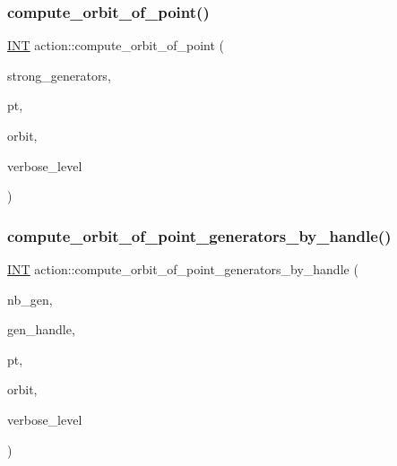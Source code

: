 \mbox{\label{classaction_af5d0e7c66ea088888ee852138f3ae012}} 
\subsubsection{\texorpdfstring{compute\+\_\+orbit\+\_\+of\+\_\+point()}{compute\_orbit\_of\_point()}}
{\footnotesize\ttfamily \mbox{\hyperlink{galois_8h_a09fddde158a3a20bd2dcadb609de11dc}{I\+NT}} action\+::compute\+\_\+orbit\+\_\+of\+\_\+point (\begin{DoxyParamCaption}\item[{\mbox{\hyperlink{classvector__ge}{vector\+\_\+ge}} \&}]{strong\+\_\+generators,  }\item[{\mbox{\hyperlink{galois_8h_a09fddde158a3a20bd2dcadb609de11dc}{I\+NT}}}]{pt,  }\item[{\mbox{\hyperlink{galois_8h_a09fddde158a3a20bd2dcadb609de11dc}{I\+NT}} $\ast$}]{orbit,  }\item[{\mbox{\hyperlink{galois_8h_a09fddde158a3a20bd2dcadb609de11dc}{I\+NT}}}]{verbose\+\_\+level }\end{DoxyParamCaption})}

\mbox{\label{classaction_a8d13b4c518ed1591695e06071de2fe6c}} 
\subsubsection{\texorpdfstring{compute\+\_\+orbit\+\_\+of\+\_\+point\+\_\+generators\+\_\+by\+\_\+handle()}{compute\_orbit\_of\_point\_generators\_by\_handle()}}
{\footnotesize\ttfamily \mbox{\hyperlink{galois_8h_a09fddde158a3a20bd2dcadb609de11dc}{I\+NT}} action\+::compute\+\_\+orbit\+\_\+of\+\_\+point\+\_\+generators\+\_\+by\+\_\+handle (\begin{DoxyParamCaption}\item[{\mbox{\hyperlink{galois_8h_a09fddde158a3a20bd2dcadb609de11dc}{I\+NT}}}]{nb\+\_\+gen,  }\item[{\mbox{\hyperlink{galois_8h_a09fddde158a3a20bd2dcadb609de11dc}{I\+NT}} $\ast$}]{gen\+\_\+handle,  }\item[{\mbox{\hyperlink{galois_8h_a09fddde158a3a20bd2dcadb609de11dc}{I\+NT}}}]{pt,  }\item[{\mbox{\hyperlink{galois_8h_a09fddde158a3a20bd2dcadb609de11dc}{I\+NT}} $\ast$}]{orbit,  }\item[{\mbox{\hyperlink{galois_8h_a09fddde158a3a20bd2dcadb609de11dc}{I\+NT}}}]{verbose\+\_\+level }\end{DoxyParamCaption})}

